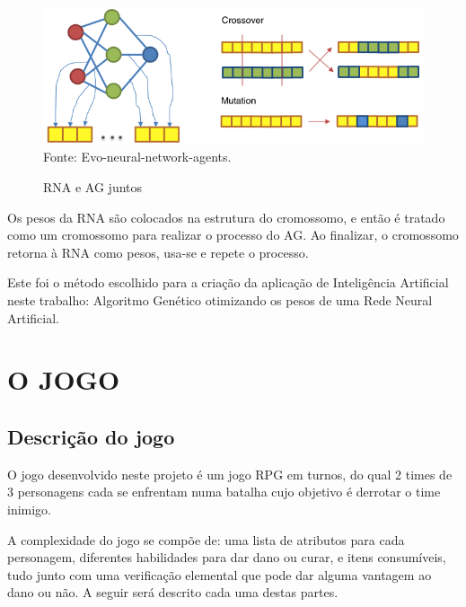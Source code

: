 \documentclass[12pt,a4paper]{article}
\newcommand{\source}[1]{\small Fonte: {#1}}
\begin{document}
	\begin{figure}[ht!]
		\centering
		\caption{RNA e AG juntos}
		\includegraphics[scale=0.7]{NeuralNetworkIntoChromosome.png}\\
		\vspace{0.5mm}
		\source{Evo-neural-network-agents.}
		\label{fig:nn-ag}
	\end{figure}
	
	Os pesos da RNA são colocados na estrutura do cromossomo,
	e então é tratado como um cromossomo para realizar o processo do AG.
	Ao finalizar, o cromossomo retorna à RNA como pesos,
	usa-se e repete o processo.
	
	Este foi o método escolhido para a criação da aplicação de Inteligência Artificial neste trabalho:
	Algoritmo Genético otimizando os pesos de uma Rede Neural Artificial.

\FloatBarrier
\newpage %
\section{O JOGO}
	
	\FloatBarrier
	\subsection{Descrição do jogo}
	O jogo desenvolvido neste projeto é um jogo RPG em turnos,
	do qual 2 times de 3 personagens cada se enfrentam numa batalha cujo objetivo é derrotar o time inimigo.
	
	A complexidade do jogo se compõe de:
	uma lista de atributos para cada personagem,
	diferentes habilidades para dar dano ou curar,
	e itens consumíveis,
	tudo junto com uma verificação elemental que pode dar alguma vantagem ao dano ou não.
	A seguir será descrito cada uma destas partes.
	
\end{document}
